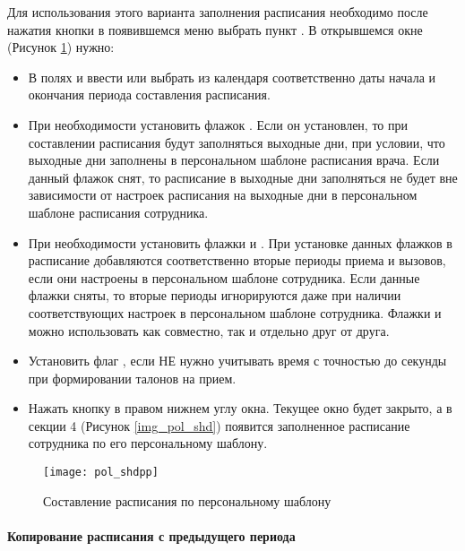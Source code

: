 Для использования этого варианта заполнения расписания необходимо после нажатия кнопки  в появившемся меню выбрать пункт . В открывшемся окне  (Рисунок \ref{img_pol_shdpp}) нужно:
\begin{itemize}
 \item В полях  и  ввести или выбрать из календаря соответственно даты начала и окончания периода составления расписания.
 \item При необходимости установить флажок . Если он установлен, то при составлении расписания будут заполняться выходные дни, при условии, что выходные дни заполнены в персональном шаблоне расписания врача. Если данный флажок снят, то расписание в выходные дни заполняться не будет вне зависимости от настроек расписания на выходные дни в персональном шаблоне расписания сотрудника.
 \item При необходимости установить флажки  и . При установке данных флажков в расписание добавляются соответственно вторые периоды приема и вызовов, если они настроены в персональном шаблоне сотрудника. Если данные флажки сняты, то вторые периоды игнорируются даже при наличии соответствующих настроек в персональном шаблоне сотрудника. Флажки  и  можно использовать как совместно, так и отдельно друг от друга.
 \item Установить флаг , если НЕ нужно учитывать время с точностью до секунды при формировании талонов на прием.
 \item Нажать кнопку  в правом нижнем углу окна. Текущее окно будет закрыто, а в секции 4 (Рисунок \ref{img_pol_shd}) появится заполненное расписание сотрудника по его персональному шаблону.
\end{itemize}

\begin{figure}[ht]\centering
 \texttt{[image: pol\_shdpp]}
 \caption{Составление расписания по персональному шаблону}
 \label{img_pol_shdpp}
\end{figure}

\paragraph{Копирование расписания с предыдущего периода} \label{pol_shdcopy}

